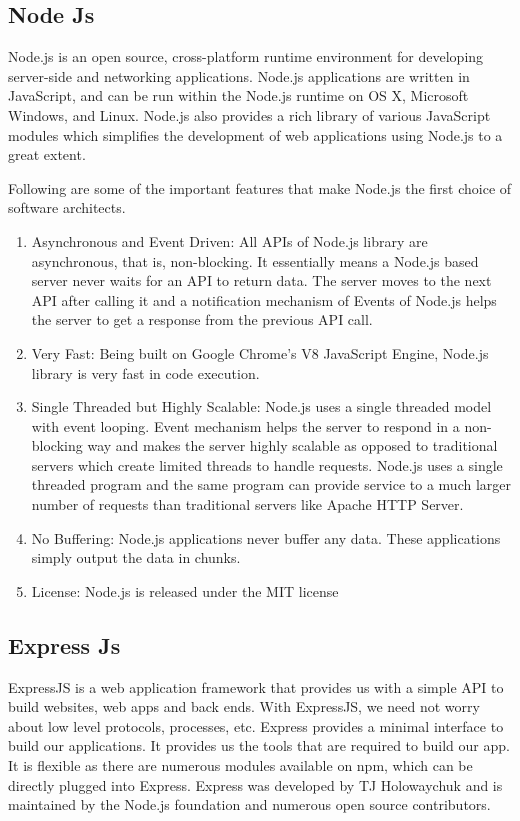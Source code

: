 \subsection{Node Js}
Node.js is an open source, cross-platform runtime environment for developing server-side and networking applications. Node.js applications are written in JavaScript, and can be run within the Node.js runtime on OS X, Microsoft Windows, and Linux.
Node.js also provides a rich library of various JavaScript modules which simplifies the development of web applications using Node.js to a great extent.

Following are some of the important features that make Node.js the first choice of software architects.
\begin{enumerate}
    \item
          Asynchronous and Event Driven: All APIs of Node.js library are asynchronous, that is, non-blocking. It essentially means a Node.js based server never waits for an API to return data. The server moves to the next API after calling it and a notification mechanism of Events of Node.js helps the server to get a response from the previous API call.
    \item
          Very Fast: Being built on Google Chrome's V8 JavaScript Engine, Node.js library is very fast in code execution.
    \item
          Single Threaded but Highly Scalable: Node.js uses a single threaded model with event looping. Event mechanism helps the server to respond in a non-blocking way and makes the server highly scalable as opposed to traditional servers which create limited threads to handle requests. Node.js uses a single threaded program and the same program can provide service to a much larger number of requests than traditional servers like Apache HTTP Server.
    \item
          No Buffering: Node.js applications never buffer any data. These applications simply output the data in chunks.
    \item
          License: Node.js is released under the MIT license
\end{enumerate}





\subsection{Express Js}
ExpressJS is a web application framework that provides us with a simple API to build websites, web apps and back ends. With ExpressJS, we need not worry about low level protocols, processes, etc.
Express provides a minimal interface to build our applications. It provides us the tools that are required to build our app. It is flexible as there are numerous modules available on npm, which can be directly plugged into Express.
Express was developed by TJ Holowaychuk and is maintained by the Node.js foundation and numerous open source contributors.



